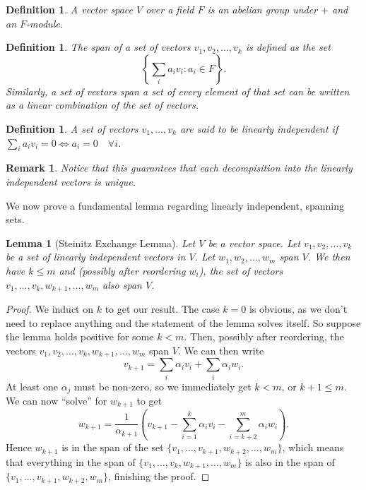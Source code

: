 \documentclass{article}
\theoremstyle{norm}
\newtheorem{lem}[thm]{Lemma}
\newtheorem{df}[thm]{Definition}
\newtheorem{rem}[thm]{Remark}
\begin{document}
\begin{df}
A vector space $V$ over a field $F$ is an abelian group under $+$ and an
$F$-module.
\end{df}

\begin{df}
The span of a set of vectors $v_1, v_2, \dots, v_k$ is defined as the
set
\[ \left\lbrace \sum_i a_i v_i : a_i \in F \right\rbrace. \]
Similarly, a set of vectors span a set of every element of that set can
be written as a linear combination of the set of vectors.
\end{df}

\begin{df}
A set of vectors $v_1, \dots, v_k$ are said to be linearly independent
if $\sum_i a_i v_i = 0 \Leftrightarrow a_i = 0 \quad \forall i$.
\end{df}

\begin{rem}
Notice that this guarantees that each decompisition into the linearly
independent vectors is unique.
\end{rem}

We now prove a fundamental lemma regarding linearly independent,
spanning sets.
\begin{lem}[Steinitz Exchange Lemma]
Let $V$ be a vector space. Let $v_1, v_2, \dots, v_k$ be a set of
linearly independent vectors in $V$. Let $w_1, w_2, \dots, w_m$ span
$V$. We then have $k \leq m$ and (possibly after reordering $w_i$), the
set of vectors $v_1, \dots, v_k, w_{k + 1}, \dots, w_m$ also span $V$.
\end{lem}

\begin{proof}
We induct on $k$ to get our result. The case $k = 0$ is obvious, as we
don't need to replace anything and the statement of the lemma solves
itself. So suppose the lemma holds positive for some $k < m$. Then,
possibly after reordering, the vectors $v_1, v_2, \dots, v_k, w_{k + 1},
\dots, w_m$ span $V$. We can then write
\[ v_{k + 1} = \sum_i \alpha_i v_i + \sum_i \alpha_i w_i. \]
At least one $\alpha_j$ must be non-zero, so we immediately get $k < m$,
or $k + 1 \leq m$. We can now ``solve'' for $w_{k + 1}$ to get
\[ w_{k + 1} = \frac{1}{\alpha_{k + 1}} \left(v_{k + 1} - \sum_{i =
1}^{k} \alpha_i v_i - \sum_{i = k + 2}^{m} \alpha_i w_i\right). \]
Hence $w_{k + 1}$ is in the span of the set $\lbrace v_1, \dots, v_{k +
1}, w_{k + 2}, \dots, w_m \rbrace$, which means that everything in the
span of $\lbrace v_1, \dots, v_k, w_{k + 1}, \dots, w_m \rbrace$ is also
in the span of $\lbrace v_1, \dots, v_{k + 1}, w_{k + 2}, w_m \rbrace$,
finishing the proof.
\end{proof}
\end{document}
